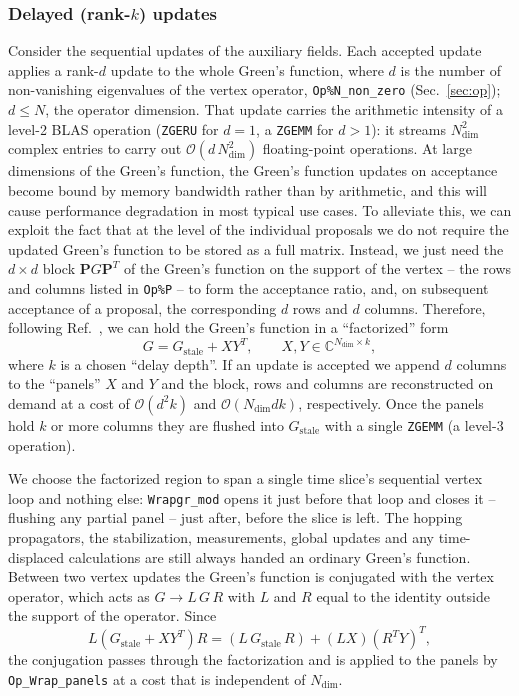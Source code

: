 \subsubsection{Delayed (rank-$k$) updates}
\label{sec:delayed}
%
Consider the sequential updates of the auxiliary fields. Each accepted update applies a
rank-$d$ update to the whole Green's function, where $d$ is the number of
non-vanishing eigenvalues of the vertex operator, \texttt{Op\%N\_non\_zero}
(Sec.~\ref{sec:op}); $d \le N$, the operator dimension. That update carries
the arithmetic intensity of a level-2 BLAS operation (\texttt{ZGERU} for
$d = 1$, a \texttt{ZGEMM} for $d>1$): it streams $N_{\mathrm{dim}}^2$
complex entries to carry out $\mathcal{O}(d \, N_{\mathrm{dim}}^2)$
floating-point operations. At large dimensions of the Green's function, the
Green's function updates on acceptance become bound by memory
bandwidth rather than by arithmetic, and this will cause performance
degradation in most typical use cases. To alleviate this, we can exploit the
fact that at the level of the individual proposals we do not require the updated
Green's function to be stored as a full matrix. Instead, we just need the
$d \times d$ block $\bm{P} G \bm{P}^{T}$ of the Green's function on the support
of the vertex -- the rows and columns listed in \texttt{Op\%P} -- to form the
acceptance ratio, and, on subsequent acceptance of a proposal, the
corresponding $d$ rows and $d$ columns.
Therefore, following Ref.~\cite{Sun2024}, we can hold the Green's function in a
``factorized'' form
\begin{equation}
  G = G_{\text{stale}} + X Y^{T},
  \qquad X, Y \in \mathbb{C}^{N_{\mathrm{dim}} \times k},
\end{equation}
where $k$ is a chosen ``delay depth''.
If an update is accepted we append $d$ columns to the ``panels'' $X$ and $Y$
and the block, rows and columns are reconstructed
on demand at a cost of $\mathcal{O}(d^2 k)$ and
$\mathcal{O}(N_{\mathrm{dim}} d k)$, respectively. Once the panels hold $k$ or
more columns they are flushed into
$G_{\text{stale}}$ with a single \texttt{ZGEMM} (a level-3 operation).

We choose the factorized region to span a single time slice's sequential
vertex loop and nothing else: \texttt{Wrapgr\_mod} opens it just before that
loop and closes it -- flushing any partial panel -- just after, before the
slice is left.
The hopping propagators, the stabilization, measurements, global updates
and any time-displaced calculations are still always handed an ordinary Green's
function. Between
two vertex updates the Green's function is conjugated with the vertex operator,
which acts as $G \rightarrow L \, G \, R$ with $L$ and $R$ equal to the identity
outside the support of the operator. Since
\begin{equation}
  L \left( G_{\text{stale}} + X Y^{T} \right) R
  = \left( L \, G_{\text{stale}} \, R \right)
  + \left( L X \right) \left( R^{T} Y \right)^{T},
\end{equation}
the conjugation passes through the factorization and is applied
to the panels by \texttt{Op\_Wrap\_panels} at a cost that is independent of
$N_{\mathrm{dim}}$.

